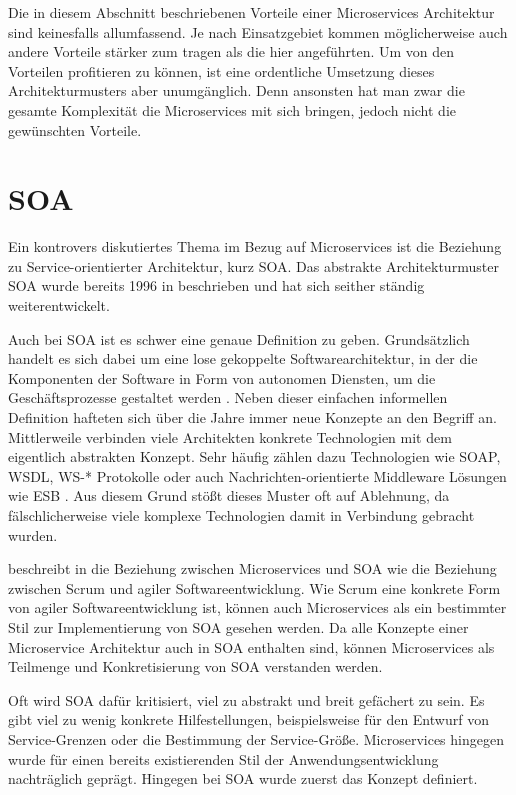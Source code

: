 Die in diesem Abschnitt beschriebenen Vorteile einer Microservices Architektur sind keinesfalls allumfassend. Je nach Einsatzgebiet kommen möglicherweise auch andere Vorteile stärker zum tragen als die hier angeführten. Um von den Vorteilen profitieren zu können, ist eine ordentliche Umsetzung dieses Architekturmusters aber unumgänglich. Denn ansonsten hat man zwar die gesamte Komplexität die Microservices mit sich bringen, jedoch nicht die gewünschten Vorteile.

\section{SOA}

Ein kontrovers diskutiertes Thema im Bezug auf Microservices ist die Beziehung zu Service-orientierter Architektur, kurz SOA. Das abstrakte Architekturmuster SOA wurde bereits 1996 in \cite{schulte1996service} beschrieben und hat sich seither ständig weiterentwickelt.

Auch bei SOA ist es schwer eine genaue Definition zu geben. Grundsätzlich handelt es sich dabei um eine lose gekoppelte Softwarearchitektur, in der die Komponenten der Software in Form von autonomen Diensten, um die Geschäftsprozesse gestaltet werden \cite{soaRW}. Neben dieser einfachen informellen Definition hafteten sich über die Jahre immer neue Konzepte an den Begriff an. Mittlerweile verbinden viele Architekten konkrete Technologien mit dem eigentlich abstrakten Konzept. Sehr häufig zählen dazu Technologien wie SOAP, WSDL, WS-* Protokolle oder auch Nachrichten-orientierte Middleware Lösungen wie ESB \cite{fowlerGoTo}. Aus diesem Grund stößt dieses Muster oft auf Ablehnung, da fälschlicherweise viele komplexe Technologien damit in Verbindung gebracht wurden.

\citeauthor{newman2015building} beschreibt in \cite{newman2015building} die Beziehung zwischen Microservices und SOA wie die Beziehung zwischen Scrum und agiler Softwareentwicklung. Wie Scrum eine konkrete Form von agiler Softwareentwicklung ist, können auch Microservices als ein bestimmter Stil zur Implementierung von SOA gesehen werden. Da alle Konzepte einer Microservice Architektur auch in SOA enthalten sind, können Microservices als Teilmenge und Konkretisierung von SOA verstanden werden.

Oft wird SOA dafür kritisiert, viel zu abstrakt und breit gefächert zu sein. Es gibt viel zu wenig konkrete Hilfestellungen, beispielsweise für den Entwurf von Service-Grenzen oder die Bestimmung der Service-Größe. Microservices hingegen wurde für einen bereits existierenden Stil der Anwendungsentwicklung nachträglich geprägt. Hingegen bei SOA wurde zuerst das Konzept definiert.

